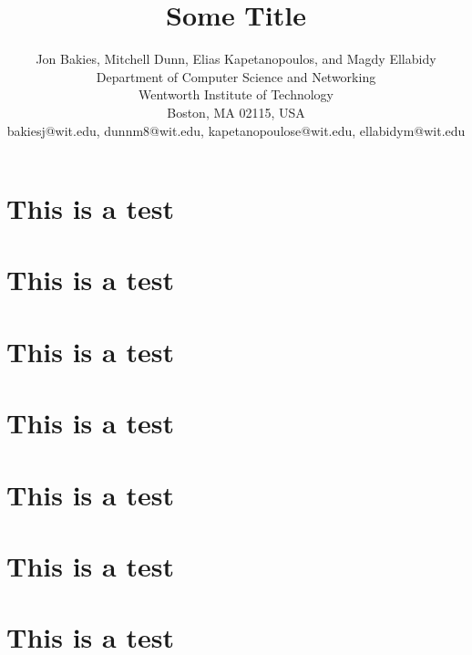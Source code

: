 \documentclass[12pt]{IEEEtran}
\begin{document}
\title{Some Title}
\author{
Jon Bakies, Mitchell Dunn, Elias Kapetanopoulos, and Magdy Ellabidy \\
Department of Computer Science and Networking \\
Wentworth Institute of Technology \\
Boston, MA 02115, USA \\
bakiesj@wit.edu, dunnm8@wit.edu, kapetanopoulose@wit.edu, ellabidym@wit.edu
} 

\maketitle
\newpage
\clearpage

\section{This is a test}
\blindtext
\section{This is a test}
\blindtext
\section{This is a test}
\blindtext
\section{This is a test}
\blindtext
\section{This is a test}
\blindtext
\section{This is a test}
\blindtext
\section{This is a test}
\blindtext

\end{document}
